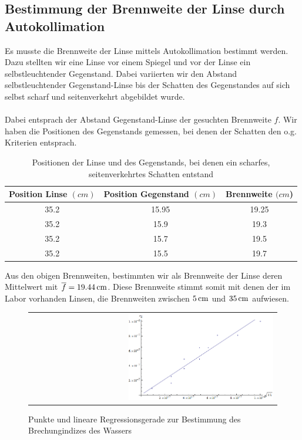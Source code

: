 \documentclass[a4paper,titlepage]{scrartcl}
\numberwithin{equation}{section}
\begin{document}
\subsection{Bestimmung der Brennweite der Linse durch Autokollimation}
Es musste die Brennweite der Linse mittels Autokollimation bestimmt werden. Dazu stellten wir eine Linse vor einem Spiegel und vor der Linse ein selbstleuchtender Gegenstand. Dabei variierten wir den Abstand selbstleuchtender Gegenstand-Linse bis der Schatten des Gegenstandes auf sich selbst scharf und seitenverkehrt abgebildet wurde.\\ \\
Dabei entsprach der Abstand Gegenstand-Linse der gesuchten Brennweite $f$. Wir haben die Positionen des Gegenstands gemessen, bei denen der Schatten den o.g. Kriterien entsprach.
\begin{table}[H]
\begin{tabular}{c|c|c}
	Position Linse $(cm)$ & Position Gegenstand $(cm)$ & Brennweite $(cm$) \\
	\hline
	35.2 & 15.95 & 19.25 \\
	35.2 & 15.9 & 19.3 \\
	35.2 & 15.7 & 19.5 \\
	35.2 & 15.5 & 19.7 \\
\end{tabular}
\caption{Positionen der Linse und des Gegenstands, bei denen ein scharfes, seitenverkehrtes Schatten entstand}
\label{tab:aufgabe13}
\end{table}
Aus den obigen Brennweiten, bestimmten wir als Brennweite der Linse deren Mittelwert mit $\overline{f}=\unit[19.44]{cm}$. Diese Brennweite stimmt somit mit denen der im Labor vorhanden Linsen, die Brennweiten zwischen $\unit[5]{cm}$ und $\unit[35]{cm}$ aufwiesen.
\begin{figure}[H]
	\centering
	\begin{tabular}{@{}r@{}}
		\includegraphics[width=0.6\textwidth]{bilder/aufgabe12.png}\\
	\end{tabular}
	\caption{Punkte und lineare Regressionsgerade zur Bestimmung des Brechungindizes des Wassers}
	\label{fig:aufgabe12}
\end{figure}
\end{document}
